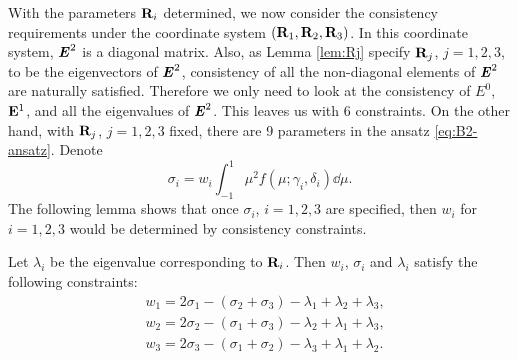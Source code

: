 With the parameters $\mathbf{R}_i$ determined, we now consider the consistency requirements under the coordinate
system $(\mathbf{R}_1,\mathbf{R}_2,\mathbf{R}_3)$. In this coordinate system, $\boldsymbol{\mathit{E}}^2$ is
a diagonal matrix. Also, as Lemma \ref{lem:Rj} specify $\mathbf{R}_j$, 
$j=1,2,3$, to be the eigenvectors of $\boldsymbol{\mathit{E}}^2$, consistency of all 
the non-diagonal elements of $\boldsymbol{\mathit{E}}^2$ are naturally satisfied. 
Therefore we only need to look at the consistency of $E^0$, $\mathbf{E}^1$, and all
the eigenvalues of $\boldsymbol{\mathit{E}}^2$. This leaves us with 6 constraints. On the 
other hand, with $\mathbf{R}_j$, $j = 1,2,3$ fixed, there are 9 parameters in the 
ansatz \eqref{eq:B2-ansatz}.
Denote
\begin{equation}\label{eq:sigma-def}
  \sigma_i = w_i \int_{-1}^1 \mu^2 f(\mu;\gamma_i,\delta_i)
  \dd\mu.
\end{equation}
The following lemma shows that once $\sigma_i$, $i = 1,2,3$ are specified, then $w_i$ 
for $i = 1,2,3$ would be determined by consistency constraints.
\begin{lemma}
  Let $\lambda_i$ be the eigenvalue corresponding to $\mathbf{R}_i$. Then
  $w_i$, $\sigma_i$ and $\lambda_i$ satisfy the following constraints:
  \begin{equation}\label{eq:w-cond}
  \begin{split}
    & w_1 = 2\sigma_1 - (\sigma_2 + \sigma_3) -\lambda_1
    +\lambda_2 + \lambda_3,\\
    & w_2 = 2\sigma_2 - (\sigma_1 + \sigma_3) - \lambda_2
    +\lambda_1 + \lambda_3,\\
    & w_3 = 2\sigma_3 - (\sigma_1 + \sigma_2) - \lambda_3
    +\lambda_1 + \lambda_2.
  \end{split}
\end{equation}
\end{lemma}
